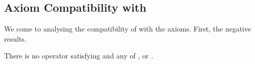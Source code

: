 \subsection{Axiom Compatibility with \chainmin{}}


We come to analysing the compatibility of \chainmin{} with the axioms.
First, the negative results.

\begin{theorem}
    \label{tourn_result_chainmin_axiom_incompatibilities}

    There is no operator satisfying \chainmin{} and any of
    \anon{}, \iim{} or \posresp{}.

\end{theorem}

